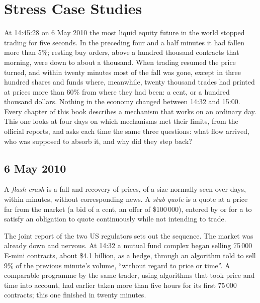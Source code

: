 \chapter{Stress Case Studies}\label{ch:m1:stress-case-studies}

At 14:45:28 on 6 May 2010 the most liquid equity future in the world stopped
trading for five seconds. In the preceding four and a half minutes it had
fallen more than 5\%; resting buy orders, above a hundred thousand contracts
that morning, were down to about a thousand. When trading resumed the price
turned, and within twenty minutes most of the fall was gone, except in three
hundred shares and funds where, meanwhile, twenty thousand trades had printed
at prices more than 60\% from where they had been: a cent, or a hundred
thousand dollars. Nothing in the economy changed between 14:32 and 15:00.
Every chapter of this book describes a mechanism that works on an ordinary
day. This one looks at four days on which mechanisms met their limits, from
the official reports, and asks each time the same three questions: what flow
arrived, who was supposed to absorb it, and why did they step back?

\section{6 May 2010}

\begin{definition}\label{def:m1:stress-case-studies:flash}
A \emph{flash crash} is a fall and recovery of prices, of a
size normally seen over days, within minutes, without corresponding news. A
\emph{stub quote} is a quote at a price far from the market
(a bid of a cent, an offer of \$100\,000), entered by or for a  to
satisfy an obligation to quote continuously while not intending to trade.
\end{definition}

The joint report of the two US regulators sets out the sequence. The market
was already down and nervous. At 14:32 a mutual fund complex began selling
75\,000 E-mini contracts, about \$4.1 billion, as a hedge, through an
algorithm told to sell 9\% of the previous minute's volume, ``without regard
to price or time''. A comparable programme by the same trader, using
algorithms that took price and time into account, had earlier taken more
than five hours for its first 75\,000 contracts; this one finished in twenty
minutes.

